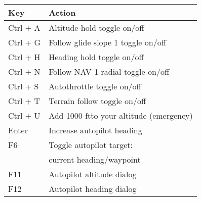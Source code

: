 \begin{tabular}{|l|l|}\hline
 Key              &         Action\\\hline
    Ctrl + A      &         Altitude hold\index{altitude hold} toggle on/off\\
    Ctrl + G      &         Follow glide slope 1 toggle on/off\\
    Ctrl + H      &         Heading hold\index{heading hold} toggle on/off\\
    Ctrl + N      &         Follow NAV 1 radial toggle on/off\\
    Ctrl + S      &         Autothrottle\index{autothrottle} toggle on/off\\
    Ctrl + T      &         Terrain follow toggle on/off\\
    Ctrl + U      &         Add 1000 ft\. to your altitude (emergency)\\
    Enter         &         Increase autopilot heading\\
    F6            &         Toggle autopilot target:\\
                  &         current heading/waypoint\\
    F11           &         Autopilot altitude dialog\\
    F12           &         Autopilot heading dialog\\\hline
\end{tabular}

